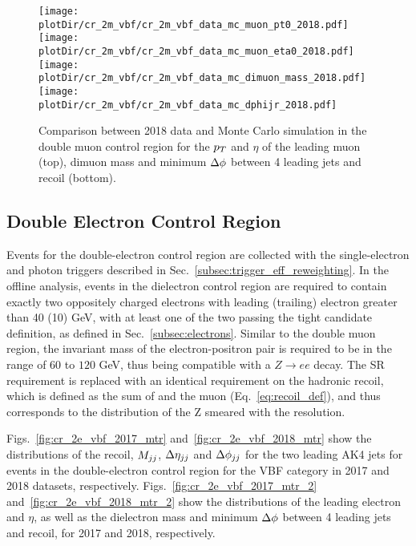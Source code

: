 \begin{figure}[htbp]
    \begin{center}
        \texttt{[image: \\plotDir/cr\_2m\_vbf/cr\_2m\_vbf\_data\_mc\_muon\_pt0\_2018.pdf]}
        \texttt{[image: \\plotDir/cr\_2m\_vbf/cr\_2m\_vbf\_data\_mc\_muon\_eta0\_2018.pdf]}
        \texttt{[image: \\plotDir/cr\_2m\_vbf/cr\_2m\_vbf\_data\_mc\_dimuon\_mass\_2018.pdf]}
        \texttt{[image: \\plotDir/cr\_2m\_vbf/cr\_2m\_vbf\_data\_mc\_dphijr\_2018.pdf]}
    \end{center}
    \caption{Comparison between 2018 data and Monte Carlo simulation in the double muon control region for
        the $p_T$ and $\eta$ of the leading muon (top), dimuon mass and minimum $\Delta \phi$ between 4 leading jets and recoil (bottom).}
    \label{fig:cr_2m_vbf_2018_mtr_2}
\end{figure}

\clearpage

\subsection{Double Electron Control Region}
\label{sec:selection_cr_2e}

Events for the double-electron control region are collected with the single-electron and 
photon triggers described in Sec.~\ref{subsec:trigger_eff_reweighting}. In the offline analysis, events in the dielectron 
control region are required to contain exactly two oppositely charged electrons with leading (trailing) 
electron \pt greater than 40 (10) GeV, with at least one of the two passing the tight candidate definition, as defined in Sec.~\ref{subsec:electrons}.
Similar to the double muon region, the invariant mass of the electron-positron pair is required to be in the range of $60$ to $120$ GeV,
thus being compatible with a $Z\rightarrow ee$ decay. 
The SR \ptmiss requirement is replaced with an identical requirement on the hadronic recoil, which is defined as the 
sum of \ptvecmiss and the muon \vpt (Eq.~\ref{eq:recoil_def}), and thus corresponds to the distribution of the Z \pt smeared with the \ptmiss resolution. 

Figs.~\ref{fig:cr_2e_vbf_2017_mtr} and~\ref{fig:cr_2e_vbf_2018_mtr} show the distributions of the recoil, $M_{jj}$, $\Delta \eta_{jj}$ and
$\Delta \phi_{jj}$ for the two leading AK4 jets for events in the double-electron control region for the VBF category 
in 2017 and 2018 datasets, respectively. 
Figs.~\ref{fig:cr_2e_vbf_2017_mtr_2} and~\ref{fig:cr_2e_vbf_2018_mtr_2} show the distributions of the leading electron \pt and $\eta$, 
as well as the dielectron mass and minimum $\Delta \phi$ between 4 leading jets and recoil, for 2017 and 2018, respectively.

